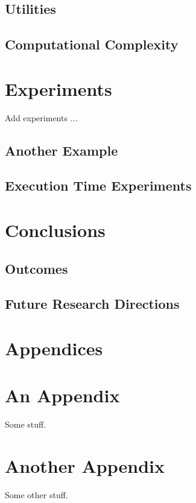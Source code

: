 \documentclass[11pt,twoside]{article}
\numberwithin{Theorem}{section}
\numberwithin{Definition}{section}
\numberwithin{Lemma}{section}
\numberwithin{Algorithm}{section}
\numberwithin{equation}{section}
\begin{document}
\subsection{Utilities}

\subsection{Computational Complexity}

\clearpage
\section{Experiments}
Add experiments ...

\subsection{Another Example}

\subsection{Execution Time Experiments}

\section{Conclusions}

\subsection{Outcomes}

\subsection{Future Research Directions}
\clearpage

\printbibliography
\clearpage

\appendix
\section*{Appendices}

\clearpage
\section{An Appendix}
\label{app:one}

Some stuff.
\clearpage

\section{Another Appendix}
\label{app:two}

Some other stuff.
\end{document}
